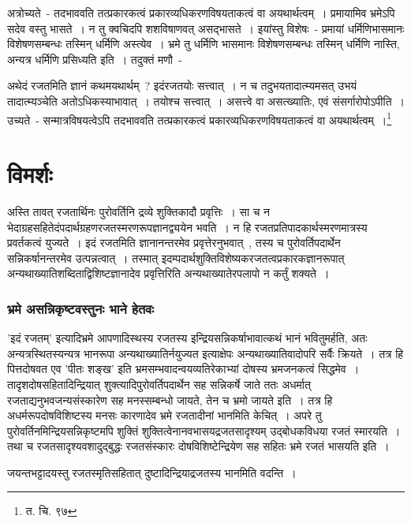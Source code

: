		अत्रोच्यते~- तदभाववति तत्प्रकारकत्वं प्रकारव्यधिकरणविषयताकत्वं वा अयथार्थत्वम्~। प्रमायामिव भ्रमेऽपि सदेव वस्तु भासते~। न तु क्वचिदपि शशविषाणवत् असद्भासते~। इयांस्तु विशेषः~- प्रमायां धर्मिणिभासमानः विशेषणसम्बन्धः तस्मिन् धर्मिणि अस्त्येव~। भ्रमे तु धर्मिणि भासमानः विशेषणसम्बन्धः तस्मिन् धर्मिणि नास्ति, अन्यत्र धर्मिणि प्रसिध्यति इति~। तदुक्तं मणौ~-

		{\fontsize{11.7}{0}\selectfont\s अथेदं रजतमिति ज्ञानं कथमयथार्थम्~? इदंरजतयोः सत्त्वात्~। न च तदुभयतादात्म्यमसत् उभयं तादात्म्यञ्चेति अतोऽधिकस्याभावात्~। तयोश्च सत्त्वात्~। असत्त्वे वा असत्ख्यातिः, एवं संसर्गारोपोऽपीति~। उच्यते~- सन्मात्रविषयत्वेऽपि तदभाववति तत्प्रकारकत्वं प्रकारव्यधिकरणविषयताकत्वं वा अयथार्थत्वम्~।\footnote{त. चि. ९७}}

	\section{विमर्शः}

	अस्ति तावत् रजतार्थिनः पुरोवर्तिनि द्रव्ये शुक्तिकादौ प्रवृत्तिः~। सा च न भेदाग्रहसहितेदंपदार्थग्रहणरजतस्मरणरूपज्ञानद्व्ययेन भवति~। न हि रजतप्रतिपादकार्थस्मरणमात्रस्य प्रवर्तकत्वं युज्यते~। इदं रजतमिति ज्ञानानन्तरमेव प्रवृत्तेरनुभवात्~, तस्य च पुरोवर्तिपदार्थेन सन्निकर्षानन्तरमेव उत्पन्नत्वात्~। तस्मात् इदम्पदार्थशुक्तिविशेष्यकरजतत्वप्रकारकज्ञानरूपात् अन्यथाख्यातिशब्दिताद्विशिष्टज्ञानादेव प्रवृत्तिरिति अन्यथाख्यातेरपलापो न कर्तुं शक्यते~।

		\subsubsection{भ्रमे असन्निकृष्टवस्तुनः भाने हेतवः}

		'इदं रजतम्' इत्यादिभ्रमे आपणादिस्थस्य रजतस्य इन्द्रियसन्निकर्षाभावात्कथं भानं भवितुमर्हति, अतः अन्यत्रस्थितस्यन्यत्र भानरूपा अन्यथाख्यातिर्नयुज्यत इत्याक्षेपः अन्यथाख्यातिवादोपरि सर्वैः क्रियते~। तत्र हि पित्तदोषवत एव 'पीतः शङ्ख' इति भ्रमसम्भवादन्वयव्यतिरेकाभ्यां दोषस्य भ्रमजनकत्वं सिद्धमेव~। तादृशदोषसहितादिन्द्रियात् शुक्त्यादिपुरोवर्तिपदार्थेन सह सन्निकर्षे जाते ततः अधर्मात् रजताद्यनुभवजन्यसंस्कारेण सह मनस्सम्बन्धो जायते, तेन च भ्रमो जायते इति~। तत्र हि अधर्मरूपदोषविशिष्टस्य मनसः कारणादेव भ्रमे रजतादीनां भानमिति केचित्~। अपरे तु पुरोवर्तिनमिन्द्रियसन्निकृष्टमपि शुक्तिं शुक्तित्वेनानवभासयद्रजतसादृश्यम् उद्बोधकविधया रजतं स्मारयति~। तथा च रजतसादृश्यवशादुद्बुद्धः रजतसंस्कारः दोषविशिष्टेन्द्रियेण सह सहितः भ्रमे रजतं भासयति इति~।  

		जयन्तभट्टादयस्तु रजतस्मृतिसहितात् दुष्टादिन्द्रियाद्रजतस्य भानमिति वदन्ति~।

